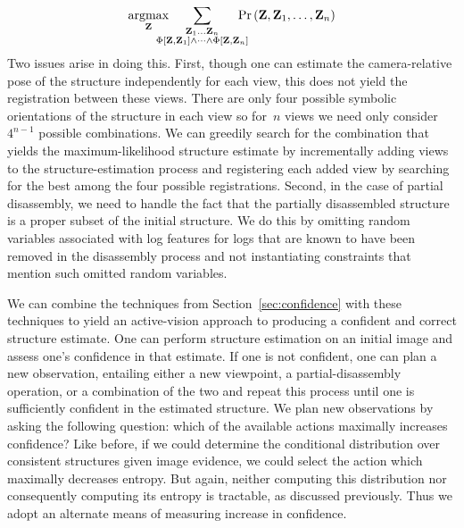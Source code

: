 \par\vspace*{-2.0ex}
\begin{equation*}
  \argmax_{\mathbf{Z}}\hspace{-12pt}
  \sum_{\substack{\mathbf{Z}_1\ldots\mathbf{Z}_n\\
      \Phi\left[\mathbf{Z},\mathbf{Z}_1\right]\wedge\cdots\wedge\Phi\left[\mathbf{Z},\mathbf{Z}_n\right]}}
  \hspace{-10pt}\Pr\left(\mathbf{Z},\mathbf{Z}_1,\ldots,\mathbf{Z}_n\right)
  \vspace*{-0.5ex}
\end{equation*}
%
Two issues arise in doing this.
%
First, though one can estimate the camera-relative pose of the structure
independently for each view, this does not yield the registration between these
views.
%
There are only four possible symbolic orientations of the structure in each
view so for~$n$ views we need only consider~$4^{n-1}$ possible combinations.
%
We can greedily search for the combination that yields the maximum-likelihood
structure estimate by incrementally adding views to the structure-estimation
process and registering each added view by searching for the best among the
four possible registrations.
%
Second, in the case of partial disassembly, we need to handle the fact that the
partially disassembled structure is a proper subset of the initial structure.
%
We do this by omitting random variables associated with log features
for logs that are known to have been removed in the disassembly process and not
instantiating constraints that mention such omitted random variables.

We can combine the techniques from Section~\ref{sec:confidence} with these
techniques to yield an active-vision \cite{Bajcsy1988} approach to producing a
confident and correct structure estimate.
%
One can perform structure estimation on an initial image and assess one's
confidence in that estimate.
%
If one is not confident, one can plan a new observation, entailing either a new
viewpoint, a partial-disassembly operation, or a combination of the two and
repeat this process until one is sufficiently confident in the estimated
structure.
%
We plan new observations by asking the following question: which of the
available actions maximally increases confidence?
%
Like before, if we could determine the conditional distribution over consistent
structures given image evidence, we could select the action which maximally
decreases entropy.
%
But again, neither computing this distribution nor consequently computing its
entropy is tractable, as discussed previously.
%
Thus we adopt an alternate means of measuring increase in confidence.

